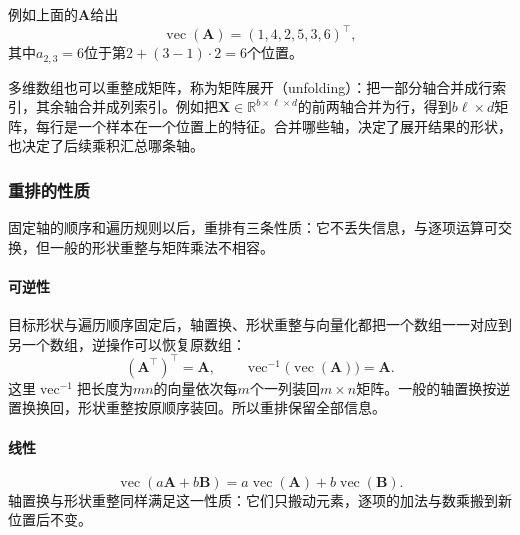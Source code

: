 例如上面的$\bm A$给出
\[
 \operatorname{vec}(\bm A)=(1,4,2,5,3,6)^\top,
\]
其中$a_{2,3}=6$位于第$2+(3-1)\cdot2=6$个位置。

多维数组也可以重整成矩阵，称为矩阵展开（unfolding）：把一部分轴合并成行索引，其余轴合并成列索引。例如把$\bm X\in\mathbb R^{b\times\ell\times d}$的前两轴合并为行，得到$b\ell\times d$矩阵，每行是一个样本在一个位置上的特征。合并哪些轴，决定了展开结果的形状，也决定了后续乘积汇总哪条轴。

\subsubsection{重排的性质}

固定轴的顺序和遍历规则以后，重排有三条性质：它不丢失信息，与逐项运算可交换，但一般的形状重整与矩阵乘法不相容。

\paragraph{可逆性}
目标形状与遍历顺序固定后，轴置换、形状重整与向量化都把一个数组一一对应到另一个数组，逆操作可以恢复原数组：
\[
 (\bm A^\top)^\top=\bm A,\qquad
 \operatorname{vec}^{-1}\bigl(\operatorname{vec}(\bm A)\bigr)=\bm A.
\]
这里$\operatorname{vec}^{-1}$把长度为$mn$的向量依次每$m$个一列装回$m\times n$矩阵。一般的轴置换按逆置换换回，形状重整按原顺序装回。所以重排保留全部信息。

\paragraph{线性}
\[
 \operatorname{vec}(a\bm A+b\bm B)=a\operatorname{vec}(\bm A)+b\operatorname{vec}(\bm B).
\]
轴置换与形状重整同样满足这一性质：它们只搬动元素，逐项的加法与数乘搬到新位置后不变。

